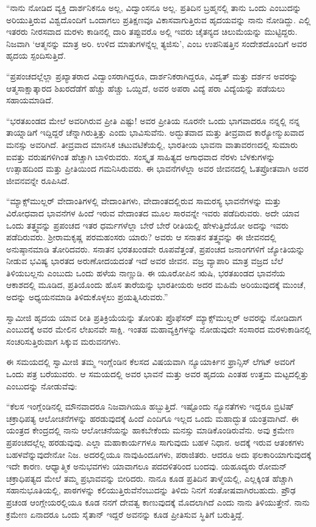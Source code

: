  “ನಾನು ನೋಡಿದ ವ್ಯಕ್ತಿ ದಾರ್ಶನಿಕನೂ ಅಲ್ಲ, ವಿದ್ವಾಂಸನೂ ಅಲ್ಲ. ಪ್ರತಿದಿನ ಬ್ರಹ್ಮನಲ್ಲಿ ತಾನು ಒಂದು ಎಂಬುದನ್ನು ಅರಿಯುತ್ತಿರುವ ವಿಶ್ವದೊಂದಿಗೆ ಒಂದಾಗಲು ಪ್ರತಿಕ್ಷಣವೂ ವಿಕಾಸವಾಗುತ್ತಿರುವ ಹೃದಯವನ್ನು ನಾನು ನೋಡಿದ್ದು. ಎಲ್ಲಿ ಇತರರು ನೀರಸವಾದ ಮರಳು ಕಾಡಿನಲ್ಲಿ ದಾರಿ ತಪ್ಪುವರೊ ಅಲ್ಲಿ ಇವರು ಚೈತನ್ಯದ ಚಿಲುಮೆಯನ್ನು ಮುಟ್ಟಿದ್ದರು. ನಿಜವಾಗಿ ‘ಆತ್ಮನನ್ನು ಮಾತ್ರ ಅರಿ. ಉಳಿದ ಮಾತುಗಳನ್ನೆಲ್ಲ ತ್ಯಜಿಸು’, ಎಂಬ ಉಪನಿಷತ್ತಿನ ಸಂದೇಶದೊಂದಿಗೆ ಅವರ ಹೃದಯ ಸ್ಪಂದಿಸುತ್ತಿದೆ.

 “ಪ್ರಪಂಚದಲ್ಲೆಲ್ಲಾ ಪ್ರಖ್ಯಾತರಾದ ವಿದ್ವಾಂಸರಾಗಿದ್ದರೂ, ದಾರ್ಶನಿಕರಾಗಿದ್ದರೂ, ವಿದ್ವತ್ ಮತ್ತು ದರ್ಶನ ಅವರನ್ನು ಆತ್ಮಸಾಕ್ಷಾತ್ಕಾರದ ಶಿಖರದೆಡೆಗೆ ಹೆಚ್ಚು ಹೆಚ್ಚು ಒಯ್ದಿದೆ, ಅವರ ಅಪರಾ ವಿದ್ಯೆ ಪರಾ ವಿದ್ಯೆಯನ್ನು ಪಡೆಯಲು ಸಹಾಯಮಾಡಿದೆ.

\newpage

 “ಭರತಖಂಡದ ಮೇಲೆ ಅವರಿಗಿರುವ ಪ್ರೀತಿ ಎಷ್ಟು! ಅವರ ಪ್ರೀತಿಯ ನೂರನೇ ಒಂದು ಭಾಗವಾದರೂ ನನ್ನಲ್ಲಿ ನನ್ನ ತಾಯ್ನಾಡಿಗೆ ಇದ್ದಿದ್ದರೆ ಚೆನ್ನಾಗಿರುತ್ತಿತ್ತು ಎಂದು ಭಾವಿಸುವೆನು. ಅದ್ಭುತವಾದ ಮತ್ತು ತೀವ್ರವಾದ ಕಾರ‍್ಯೋನ್ಮುಖವಾದ ಮನಸ್ಸು ಅವರಿಗಿದೆ. ತೀವ್ರವಾದ ಮಾನಸಿಕ ಚಟುವಟಿಕೆಯಲ್ಲಿ, ಭಾರತೀಯ ಭಾವನಾ ವಾತಾವರಣದಲ್ಲಿ ಸುಮಾರು ಐವತ್ತು ವರುಷಗಳಿಗಿಂತ ಹೆಚ್ಚಾಗಿ ಬಾಳಿರುವರು. ಸಂಸ್ಕೃತ ಸಾಹಿತ್ಯದ ಅಗಾಧವಾದ ನೆರಳು ಬೆಳಕುಗಳನ್ನು ಉತ್ಸಾಹದಿಂದ ಮತ್ತು ಪ್ರೀತಿಯಿಂದ ಗಮನಿಸಿರುವರು. ಈ ಭಾವನೆಗಳೆಲ್ಲಾ ಅವರ ಜೀವನದಲ್ಲಿ ಓತಪ್ರೋತವಾಗಿ ಅವರ ಜೀವನವನ್ನೇ ರೂಪಿಸಿದೆ. 

 “ಮ್ಯಾಕ್ಸ್‌ಮುಲ್ಲರ್ ವೇದಾಂತಿಗಳಲ್ಲಿ ವೇದಾಂತಿಗಳು, ವೇದಾಂತದಲ್ಲಿರುವ ಸಾಮರಸ್ಯ ಭಾವನೆಗಳನ್ನು ಮತ್ತು ವಿರೋಧವಾದ ಭಾವನೆಗಳ ಹಿಂದೆ ಇರುವ ವೇದಾಂತದ ಮೂಲ ಸಾರವನ್ನೇ ಇವರು ಪಡೆದಿರುವರು. ಅದೇ ಯಾವ ಒಂದು ತತ್ತ್ವವನ್ನು ಪ್ರಪಂಚದ ಇತರ ಧರ್ಮಗಳೆಲ್ಲಾ ಬೇರೆ ಬೇರೆ ರೀತಿಯಲ್ಲಿ ಹೇಳುತ್ತಿದೆಯೋ ಅದನ್ನು ಇವರು ಪಡೆದಿರುವರು. ಶ‍್ರೀರಾಮಕೃಷ್ಣ ಪರಮಹಂಸರು ಯಾರು? ಅವರು ಆ ಸನಾತನ ತತ್ತ್ವವನ್ನು ಈ ಜೀವನದಲ್ಲಿ ಅನುಷ್ಠಾನಮಾಡಿ ತೋರಿದವರು. ಸನಾತನ ಭರತಖಂಡವೇ ರೂಪವೆತ್ತಂತೆ, ಪ್ರಪಂಚದ ಜನಾಂಗಗಳಿಗೆ ಜ್ಯೋತಿಯನ್ನು ನೀಡುವ ಭವಿಷ್ಯ ಭಾರತದ ಅರುಣೋದಯದಂತೆ ಇದೆ ಅವರ ಜೀವನ. ವಜ್ರ ವ್ಯಾಪಾರಿ ಮಾತ್ರ ವಜ್ರದ ಬೆಲೆ ತಿಳಿಯಬಲ್ಲನು ಎಂಬುದು ಒಂದು ಹಳೆಯ ನಾಣ್ಣುಡಿ. ಈ ಯೂರೋಪಿನ ಋಷಿ, ಭರತಖಂಡದ ಭಾವನೆಯ ಆಕಾಶದಲ್ಲಿ ಮೂಡಿದ, ಪ್ರತಿಯೊಂದು ಹೊಸ ತಾರೆಯನ್ನು ಭಾರತೀಯರು ಅದರ ಮಹಿಮೆ ಅರಿಯುವುದಕ್ಕೆ ಮುಂಚೆ, ಅದನ್ನು ಅಧ್ಯಯನಮಾಡಿ ತಿಳಿದುಕೊಳ್ಳಲು ಪ್ರಯತ್ನಿಸಿರುವರು.”

 ಸ್ವಾಮೀಜಿ ಹೃದಯ ಯಾವ ರೀತಿ ಪ್ರತಿಕ್ರಿಯೆಯನ್ನು ತೋರಿತು ಪ್ರೊಫೆಸರ್ ಮ್ಯಾಕ್ಸ್‌ಮುಲ್ಲರ್ ಅವರನ್ನು ನೋಡಿದಾಗ ಎಂಬುದಕ್ಕೆ ಅವರ ಮೇಲಿನ ಲೇಖನವೇ ಸಾಕ್ಷಿ. ಇಂತಹ ಮಹಾವ್ಯಕ್ತಿಗಳನ್ನು ನೋಡುವುದೇ ಸಂಸಾರದ ಮರಳುಕಾಡಿನಲ್ಲಿ ಸಂಚರಿಸುತ್ತಿರುವಾಗ ಸಿಕ್ಕುವ ಮರುವನಗಳು. 

 ಈ ಸಮಯದಲ್ಲಿ ಸ್ವಾಮೀಜಿ ತಮ್ಮ ಇಂಗ್ಲೆಂಡಿನ ಕೆಲಸದ ವಿಷಯವಾಗಿ ನ್ಯೂಯಾರ್ಕಿನ ಫ್ರಾನ್ಸಿಸ್ ಲೆಗಟ್ ಅವರಿಗೆ ಒಂದು ಪತ್ರ ಬರೆಯುವರು. ಆ ಸಮಯದಲ್ಲಿ ಅವರ ಭಾವನೆ ಮತ್ತು ಅವರ ಹೃದಯ ಎಂತಹ ಉತ್ತಮ ಮಟ್ಟದಲ್ಲಿತ್ತು ಎಂಬುದನ್ನು ನೋಡುವೆವು: 

 “ಕೆಲಸ ಇಂಗ್ಲೆಂಡಿನಲ್ಲಿ ಮೌನವಾದರೂ ನಿಜವಾಗಿಯೂ ಹಬ್ಬುತ್ತಿದೆ. ಇಷ್ಟೊಂದು ನ್ಯೂನತೆಗಳು ಇದ್ದರೂ ಬ್ರಿಟಿಷ್ ಚಕ್ರಾಧಿಪತ್ಯ ಆಲೋಚನೆಗಳನ್ನು ಹರಡುವುದಕ್ಕೆ ಹಿಂದೆ ಎಂದಿಗೂ ಇಲ್ಲದ ಒಂದು ಮಹಾದ್ಭುತ ಯಂತ್ರವಾಗಿದೆ. ಈ ಯಂತ್ರದ ಕೇಂದ್ರದಲ್ಲಿ ನಾನು ಆಲೋಚನೆಯನ್ನು ಹಾಕಬೇಕೆಂದು ಮನಸ್ಸು ಮಾಡಿಕೊಂಡಿರುವೆನು. ಅವು ಕ್ರಮೇಣ ಪ್ರಪಂಚದಲ್ಲೆಲ್ಲ ಹರಡುವುವು. ಎಲ್ಲಾ ಮಹಾಕಾರ್ಯಗಳೂ ಸಾಗುವುದು ಬಹಳ ನಿಧಾನ. ಅದಕ್ಕೆ ಇರುವ ಆತಂಕಗಳು ಬಹಳವೆನ್ನುವುದೇನೋ ನಿಜ. ಅದರಲ್ಲಿಯೂ ನಾವು\break ಹಿಂದೂಗಳು, ಪರಾಜಿತರು. ಆದರೂ ಅದು ಫಲಕಾರಿಯಾಗುವುದಕ್ಕೆ ಇದೇ ಕಾರಣ. ಆಧ್ಯಾತ್ಮಿಕ ಅನುಭವಗಳು ಯಾವಾಗಲೂ ಪದದಳಿತರಿಂದ ಬಂದವು. ಯಹೂದ್ಯರು ರೋಮನ್ ಚಕ್ರಾಧಿಪತ್ಯದ ಮೇಲೆ ತಮ್ಮ ಪ್ರಭಾವವನ್ನು ಬೀರಿದರು. ನಾನೂ ಕೂಡ ಪ್ರತಿದಿನ ತಾಳ್ಮೆಯಲ್ಲಿ, ಎಲ್ಲಕ್ಕಿಂತ ಹೆಚ್ಚಾಗಿ ಸಹಾನುಭೂತಿಯಲ್ಲಿ, ಪಾಠಗಳನ್ನು ಕಲಿಯುತ್ತಿರುವೆನೆಂಬುದನ್ನು ತಿಳಿದು ನಿನಗೆ ಸಂತೋಷವಾಗಿರಬಹುದು. ಪ್ರೌಢ ಪ್ರಚಂಡ ಆಂಗ್ಲೇಯರಲ್ಲಿಯೂ ಕೂಡ ನನಗೆ ದೇವತ್ವ ಕಾಣುವುದಕ್ಕೆ ಮೊದಲಾಗಿದೆ ಎಂದು ನಾನು ತಿಳಿಯುತ್ತೇನೆ. ನಾನು ಕ್ರಮೇಣ ಏನಾದರೂ ಒಂದು ಸೈತಾನ್ ಇದ್ದರೆ ಅವನನ್ನು ಕೂಡ ಪ್ರೀತಿಸುವ ಸ್ಥಿತಿಗೆ ಬರುತ್ತಿದ್ದೆ.

